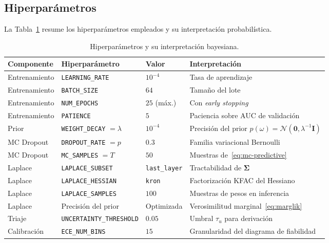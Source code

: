 \documentclass{article}
\begin{document}
\subsection{Hiperpar\'ametros}
\label{sec:hp}
 
La Tabla~\ref{tab:hyper} resume los hiperpar\'ametros empleados y su interpretación probabilística.
 
\begin{table}[t]
  \caption{Hiperpar\'ametros y su interpretaci\'on bayesiana.}
  \label{tab:hyper}
  \centering
  \small
  \begin{tabular}{llll}
    \toprule
    Componente & Hiperpar\'ametro & Valor & Interpretaci\'on \\
    \midrule
    Entrenamiento & \texttt{LEARNING\_RATE}        & $10^{-4}$     & Tasa de aprendizaje \\
    Entrenamiento & \texttt{BATCH\_SIZE}           & $64$          & Tama\~no del lote \\
    Entrenamiento & \texttt{NUM\_EPOCHS}           & $25$ (m\'ax.) & Con \emph{early stopping} \\
    Entrenamiento & \texttt{PATIENCE}              & $5$           & Paciencia sobre AUC de validaci\'on \\
    Prior         & \texttt{WEIGHT\_DECAY} $=\lambda$ & $10^{-4}$ & Precisi\'on del prior $p(\omega)=\mathcal{N}(\mathbf{0},\lambda^{-1}\mathbf{I})$ \\
    MC Dropout    & \texttt{DROPOUT\_RATE} $=p$   & $0{.}3$       & Familia variacional Bernoulli \\
    MC Dropout    & \texttt{MC\_SAMPLES} $=T$     & $50$          & Muestras de~\eqref{eq:mc-predictive} \\
    Laplace       & \texttt{LAPLACE\_SUBSET}      & \texttt{last\_layer} & Tractabilidad de $\boldsymbol{\Sigma}$ \\
    Laplace       & \texttt{LAPLACE\_HESSIAN}     & \texttt{kron} & Factorizaci\'on KFAC del Hessiano \\
    Laplace       & \texttt{LAPLACE\_SAMPLES}     & $100$         & Muestras de pesos en inferencia \\
    Laplace       & Precisi\'on del prior         & Optimizada    & Verosimilitud marginal~\eqref{eq:marglik} \\
    Triaje        & \texttt{UNCERTAINTY\_THRESHOLD} & $0{.}05$    & Umbral $\tau_{u}$ para derivaci\'on \\
    Calibraci\'on & \texttt{ECE\_NUM\_BINS}       & $15$          & Granularidad del diagrama de fiabilidad \\
    \bottomrule
  \end{tabular}
\end{table}
\end{document}
